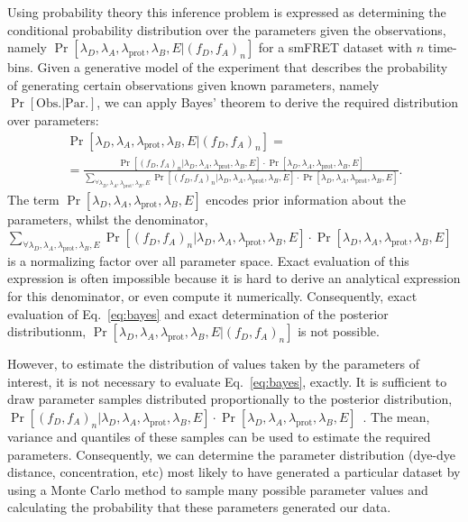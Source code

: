 Using probability theory this inference problem is expressed as determining the conditional probability distribution over the parameters given the observations, namely $\Pr[\lambda_D, \lambda_A, \lambda_{\text{prot}}, \lambda_B, E | (f_D, f_A)_n]$ for a smFRET dataset with $n$ time-bins. Given a generative model of the experiment that describes the probability of generating certain observations given known parameters, namely $\Pr[\text{Obs.} | \text{Par.}]$, we can apply Bayes' theorem to derive the required distribution over parameters:
\begin{multline}
\Pr[\lambda_D, \lambda_A, \lambda_{\text{prot}}, \lambda_B, E | (f_D, f_A)_n] = \\ = \frac{\Pr[(f_D, f_A)_n |\lambda_D, \lambda_A, \lambda_{\text{prot}}, \lambda_B, E] \cdot \Pr[\lambda_D, \lambda_A, \lambda_{\text{prot}}, \lambda_B, E]}
{\sum_{\forall \lambda_D, \lambda_A, \lambda_{\text{prot}}, \lambda_B, E} \Pr[(f_D, f_A)_n | \lambda_D, \lambda_A, \lambda_{\text{prot}}, \lambda_B, E] \cdot \Pr[\lambda_D, \lambda_A, \lambda_{\text{prot}}, \lambda_B, E]}. 
\label{eq:bayes}
\end{multline}
The term $\Pr[\lambda_D, \lambda_A, \lambda_{\text{prot}}, \lambda_B, E]$ encodes prior information about the parameters, whilst the denominator, $\sum_{\forall \lambda_D, \lambda_A, \lambda_{\text{prot}}, \lambda_B, E} \Pr[(f_D, f_A)_n | \lambda_D, \lambda_A, \lambda_{\text{prot}}, \lambda_B, E] \cdot \Pr[\lambda_D, \lambda_A, \lambda_{\text{prot}}, \lambda_B, E]$ is a normalizing factor over all parameter space. Exact evaluation of this expression is often impossible because it is hard to derive an analytical expression for this denominator, or even compute it numerically. Consequently, exact evaluation of Eq.~\ref{eq:bayes} and exact determination of the posterior distributionm, $\Pr[\lambda_D, \lambda_A, \lambda_{\text{prot}}, \lambda_B, E | (f_D, f_A)_n]$ is not possible.

However, to estimate the distribution of values taken by the parameters of interest, it is not necessary to evaluate Eq.~\ref{eq:bayes}, exactly. It is sufficient to draw parameter samples distributed proportionally to the posterior distribution, $\Pr[(f_D, f_A)_n |\lambda_D, \lambda_A, \lambda_{\text{prot}}, \lambda_B, E] \cdot \Pr[\lambda_D, \lambda_A, \lambda_{\text{prot}}, \lambda_B, E]$~\cite{hastings70}. The mean, variance and quantiles of these samples can be used to estimate the required parameters. Consequently, we can determine the parameter distribution (dye-dye distance, concentration, etc) most likely to have generated a particular dataset by using a Monte Carlo method to sample many possible parameter values and calculating the probability that these parameters generated our data.

